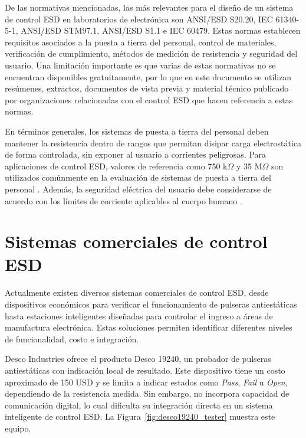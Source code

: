 De las normativas mencionadas, las más relevantes para el diseño de un sistema de control
ESD en laboratorios de electrónica son ANSI/ESD S20.20, IEC 61340-5-1, ANSI/ESD
STM97.1, ANSI/ESD S1.1 e IEC 60479. Estas normas establecen requisitos asociados a la
puesta a tierra del personal, control de materiales, verificación de cumplimiento, métodos
de medición de resistencia y seguridad del usuario. Una limitación importante es que
varias de estas normativas no se encuentran disponibles gratuitamente, por lo que en este
documento se utilizan resúmenes, extractos, documentos de vista previa y material técnico
publicado por organizaciones relacionadas con el control ESD que hacen referencia a estas
normas.

\vspace{2mm}

En términos generales, los sistemas de puesta a tierra del personal deben mantener la
resistencia dentro de rangos que permitan disipar carga electrostática de forma controlada,
sin exponer al usuario a corrientes peligrosas. Para aplicaciones de control ESD, valores
de referencia como 750 k$\Omega$ y 35 M$\Omega$ son utilizados comúnmente en la evaluación
de sistemas de puesta a tierra del personal \cite{IEC61340_Preview}. Además, la
seguridad eléctrica del usuario debe considerarse de acuerdo con los límites de corriente
aplicables al cuerpo humano \cite{IEC60479_Resume}.

\section{Sistemas comerciales de control ESD}

Actualmente existen diversos sistemas comerciales de control ESD, desde dispositivos
económicos para verificar el funcionamiento de pulseras antiestáticas hasta estaciones
inteligentes diseñadas para controlar el ingreso a áreas de manufactura electrónica. Estas
soluciones permiten identificar diferentes niveles de funcionalidad, costo e integración.

Desco Industries ofrece el producto Desco 19240, un probador de pulseras antiestáticas
con indicación local de resultado. Este dispositivo tiene un costo aproximado de 150 USD
\cite{Desco_19240} y se limita a indicar estados como \textit{Pass}, \textit{Fail} u
\textit{Open}, dependiendo de la resistencia medida. Sin embargo, no incorpora capacidad
de comunicación digital, lo cual dificulta su integración directa en un sistema inteligente
de control ESD. La Figura~\ref{fig:desco19240_tester} muestra este equipo.

